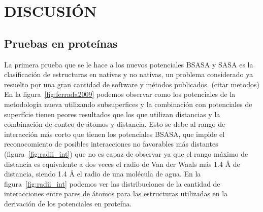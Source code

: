 \cleardoublepage
\newpage
\section*{DISCUSIÓN}
\par{}
\subsection{Pruebas en proteínas}
\par
La primera prueba que se le hace a los nuevos potenciales BSASA y SASA es la clasificación de estructuras en nativas y no nativas, un problema considerado ya resuelto por una gran cantidad de software y métodos publicados. (citar metodos)
En la figura~\ref{fig:ferrada2009} podemos observar como los potenciales de la metodología nueva utilizando subsuperfices y la combinación con potenciales de superfície tienen peores resultados que los que utilizan distancias y la combinación de conteo de átomos y distancia.
Esto se debe al rango de interacción más corto que tienen los potenciales BSASA, que impide el reconocomiento de posibles interacciones no favorables más distantes (figura~\ref{fig:radii_int}) que no es capaz de observar ya que el rango máximo de distancia es equivalente a dos veces el radio de Van der Waals más 1.4 \si{\angstrom} de distancia, siendo 1.4 \si{\angstrom} el radio de una molécula de agua.
En la figura~\ref{fig:radii_int} podemos ver las distribuciones de la cantidad de interacciones entre pares de átomos para las estructuras utilizadas en la derivación de los potenciales en proteína.
